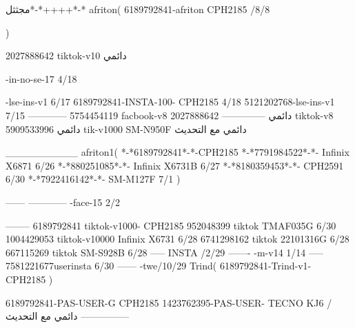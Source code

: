 مجثثل*-*++++*-*
afriton(
6189792841-afriton CPH2185  /8/8

)

2027888642 tiktok-v10
دائمي

-in-no-se-17 4/18

-lse-ins-v1 6/17
6189792841-INSTA-100- CPH2185 4/18
5121202768-lse-ins-v1 7/15
------------
5754454119 facbook-v8
دائمي
--------------
2027888642 tiktok-v8
دائمي
5909533996 tik-v1000  SM-N950F
دائمي مع التحديث

__________
afriton1(
*-*6189792841*-*-CPH2185
*-*7791984522*-*- Infinix X6871  6/26
*-*880251085*-*-  Infinix X6731B  6/27
*-*8180359453*-*-  CPH2591  6/30
*-*7922416142*-*-  SM-M127F  7/1
)


------
------------
-face-15 2/2

--------
6189792841 tiktok-v1000- CPH2185 
952048399 tiktok TMAF035G  6/30
1004429053 tiktok-v10000 Infinix X6731  6/28
6741298162 tiktok 22101316G  6/28
667115269 tiktok SM-S928B  6/28
-----
 INSTA /2/29
-------
-m-v14 1/14
-----
7581221677userinsta 6/30
------
-twe/10/29
Trind(
6189792841-Trind-v1- CPH2185 
)


6189792841-PAS-USER-G CPH2185 
1423762395-PAS-USER- TECNO KJ6  /دائمي مع التحديث
    ---------------
